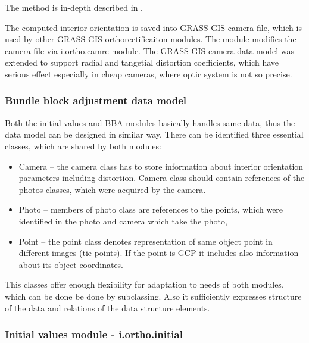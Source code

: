 \documentclass[a4paper,12pt]{article}
\begin{document}
The method is in-depth described 
in \cite{zhang2000flexible}.



The computed interior orientation is saved into GRASS GIS camera file, which is used by other GRASS GIS 
orthorectificaiton modules. The module modifies the camera file via i.ortho.camre module.
The GRASS GIS camera data model was extended to support radial and tangetial distortion coefficients, which 
have serious effect especially in cheap cameras, where optic system is not so precise.

\subsubsection{Bundle block adjustment data model}
 

Both the initial values and BBA modules basically handles  same data, thus 
the data model can be designed in similar way. There can be 
identified three essential classes, which are shared by both modules:
\begin{itemize}
\item Camera -- the camera class has to store information about interior orientation 
parameters including distortion. Camera class should contain references of the photos
classes, which were acquired by the camera.
\item Photo -- members of photo class are references to the points, which were identified 
	    in the photo and camera which take the photo,
\item Point -- the point class denotes representation of same object point in different images (tie points).
 If the point is GCP it includes also information about its object coordinates. 
\end{itemize}


This classes offer enough flexibility for adaptation to needs of both modules, which can be done be done by subclassing. 
Also it sufficiently expresses  structure of the data and relations of the data structure elements.

\subsubsection{Initial values module - i.ortho.initial}

\end{document}
